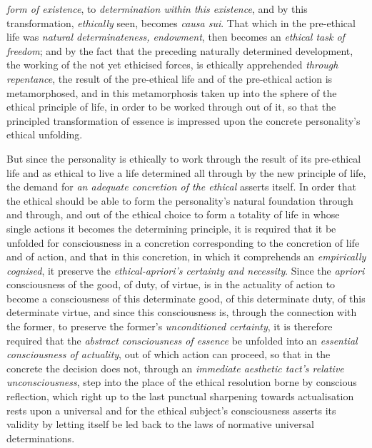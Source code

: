 \documentclass[12pt,a4paper]{book}
\begin{document}
\emph{form of existence}, to \emph{determination within this existence}, and by
this transformation, \emph{ethically} seen, becomes \emph{\textit{causa sui}}.
That which in the pre-ethical life was \emph{natural determinateness,
endowment}, then becomes an \emph{ethical task of freedom}; and by the fact that
the preceding naturally determined development, the working of the not yet
ethicised forces, is ethically apprehended \emph{through repentance}, the result
of the pre-ethical life and of the pre-ethical action is metamorphosed, and in
this metamorphosis taken up into the sphere of the ethical principle of life, in
order to be worked through out of it, so that the principled transformation of
essence is impressed upon the concrete personality's ethical unfolding.

But since the personality is ethically to work through the result of its
pre-ethical life and as ethical to live a life determined all through by the new
principle of life, the demand for \emph{an adequate concretion of the ethical}
asserts itself. In order that the ethical should be able to form the
personality's natural foundation through and through, and out of the ethical
choice to form a totality of life in whose single actions it becomes the
determining principle, it is required that it be unfolded for consciousness in a
concretion corresponding to the concretion of life and of action, and that in
this concretion, in which it comprehends an \emph{empirically cognised}, it
preserve the \emph{ethical-apriori's certainty and necessity}. Since the
\emph{apriori} consciousness of the good, of duty, of virtue, is in the actuality
of action to become a consciousness of this determinate good, of this determinate
duty, of this determinate virtue, and since this consciousness is, through the
connection with the former, to preserve the former's \emph{unconditioned
certainty}, it is therefore required that the \emph{abstract consciousness of
essence} be unfolded into an \emph{essential consciousness of actuality}, out of
which action can proceed, so that in the concrete the decision does not, through
an \emph{immediate aesthetic tact's relative unconsciousness}, step into the
place of the ethical resolution borne by conscious reflection, which right up to
the last punctual sharpening towards actualisation rests upon a universal and
for the ethical subject's consciousness asserts its validity by letting itself
be led back to the laws of normative universal determinations.
\end{document}
